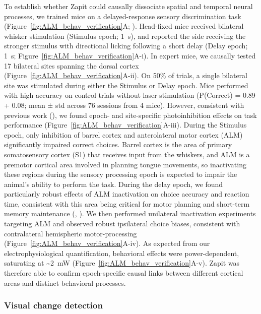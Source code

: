 \documentclass[9pt,lineno]{elife}
\begin{document}
To establish whether Zapit could causally dissociate spatial and temporal neural processes, we trained mice on a delayed-response sensory discrimination task (Figure~\ref{fig:ALM_behav_verification}A; \citealp{Gauld2024APerception}).
Head-fixed mice received bilateral whisker stimulation (Stimulus epoch; 1~s), and reported the side receiving the stronger stimulus with directional licking following a short delay (Delay epoch; 1~s; Figure~\ref{fig:ALM_behav_verification}A-i).
In expert mice, we causally tested 17 bilateral sites spanning the dorsal cortex (Figure~\ref{fig:ALM_behav_verification}A-ii).
On 50\% of trials, a single bilateral site was stimulated during either the Stimulus or Delay epoch.
Mice performed with high accuracy on control trials without laser stimulation (P(Correct) = 0.89 + 0.08; mean ± std across 76 sessions from 4 mice).
However, consistent with previous work (\citealp{Guo2014FlowMice}), we found epoch- and site-specific photoinhibition effects on task performance (Figure~\ref{fig:ALM_behav_verification}A-iii).
During the Stimulus epoch, only inhibition of barrel cortex and anterolateral motor cortex (ALM) significantly impaired correct choices.
Barrel cortex is the area of primary somatosensory cortex (S1) that receives input from the whiskers, and ALM is a premotor cortical area involved in planning tongue movements, so inactivating these regions during the sensory processing epoch is expected to impair the animal’s ability to perform the task.
During the delay epoch, we found particularly robust effects of ALM inactivation on choice accuracy and reaction time, consistent with this area being critical for motor planning and short-term memory maintenance (\citealp{Guo2014FlowMice}, \citealp{Li2016RobustPlanning}).
We then performed unilateral inactivation experiments targeting ALM and observed robust ipsilateral choice biases, consistent with contralateral hemispheric motor-processing (Figure~\ref{fig:ALM_behav_verification}A-iv).
As expected from our electrophysiological quantification, behavioral effects were power-dependent, saturating at \textasciitilde2~mW (Figure~\ref{fig:ALM_behav_verification}A-v).
Zapit was therefore able to confirm epoch-specific causal links between different cortical areas and distinct behavioral processes.

\subsubsection{Visual change detection}
\end{document}
